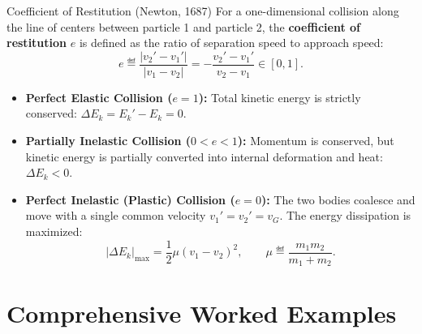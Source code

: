 \begin{definitionbox}{Coefficient of Restitution (Newton, 1687)}
For a one-dimensional collision along the line of centers between particle 1 and particle 2, the \textbf{coefficient of restitution} $e$ is defined as the ratio of separation speed to approach speed:
\begin{equation}
e \eqdef \frac{|v_2' - v_1'|}{|v_1 - v_2|} = -\frac{v_2' - v_1'}{v_2 - v_1} \in [0, 1].
\end{equation}
\begin{itemize}[leftmargin=1.5em,itemsep=3pt]
  \item \textbf{Perfect Elastic Collision ($e = 1$):} Total kinetic energy is strictly conserved: $\Delta E_k = E_k' - E_k = 0$.
  \item \textbf{Partially Inelastic Collision ($0 < e < 1$):} Momentum is conserved, but kinetic energy is partially converted into internal deformation and heat: $\Delta E_k < 0$.
  \item \textbf{Perfect Inelastic (Plastic) Collision ($e = 0$):} The two bodies coalesce and move with a single common velocity $v_1' = v_2' = v_G$. The energy dissipation is maximized:
  \begin{equation}
  |\Delta E_k|_{\max} = \frac{1}{2} \mu (v_1 - v_2)^2, \qquad \mu \eqdef \frac{m_1 m_2}{m_1 + m_2}.
  \end{equation}
\end{itemize}
\end{definitionbox}

\section{Comprehensive Worked Examples}

